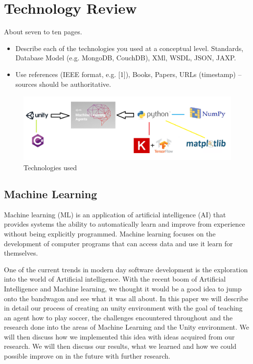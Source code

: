
\chapter{Technology Review}
About seven to ten pages.
\begin{itemize}
    \item Describe each of the technologies you used at a conceptual level. Standards, Database Model (e.g. MongoDB, CouchDB), XMl, WSDL, JSON, JAXP.
    \item Use references (IEEE format, e.g. [1]), Books, Papers, URLs (timestamp) – sources should be authoritative.
\end{itemize}

\begin{figure}[H]
    \centering
    \includegraphics[width=130mm, height=35mm]{img/TechUsed.png}
    \caption{Technologies used}
    \label{fig:sd4}
\end{figure}

\section{Machine Learning}
Machine learning (ML) is an application of artificial intelligence (AI) that provides systems the ability to automatically learn and improve from experience without being explicitly programmed. Machine learning focuses on the development of computer programs that can access data and use it learn for themselves.

One of the current trends in modern day software development is the exploration into the world of Artificial intelligence.
With the recent boom of Artificial Intelligence and Machine learning, we thought it would be a good idea to jump onto the bandwagon and see what it was all about.
In this paper we will describe in detail our process of creating an unity environment with the goal of teaching an agent how to play soccer, the challenges encountered throughout and the research done into the areas of Machine Learning and the Unity environment.  We will then discuss how we implemented this idea with ideas acquired from our research. We will then discuss our results, what we learned and how we could possible improve on in the future with further research.

